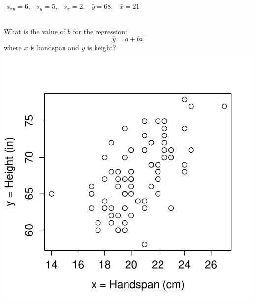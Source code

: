 \documentclass[handout]{beamer}
\begin{document}
\begin{frame}
\alert{$\begin{array}{ccccc} s_{xy} = 6,&s_y = 5,& s_x = 2,& \bar{y} = 68,& \bar{x} = 21\end{array}$}
\begin{columns}[c]
\column{2.5in}
What is the value of $b$ for the regression: $$\hat{y}=a+bx$$
where \alert{$x$ is handspan and $y$ is height? }
\column{1.8in}
\includegraphics[scale = 0.4]{./images/handspan_height}
\end{columns}
\alert{$$\phantom{b = \frac{s_{xy}}{s_x^2} = 6 /2.2^2 \approx 1.2}$$}
\end{frame}
\end{document}
